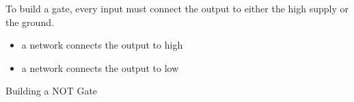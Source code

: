 \documentclass[mathserif, handout]{beamer}
\begin{document}
\begin{frame}
  To build a gate, every input must connect the output to either the high supply or the ground.\\[3mm]
  \begin{itemize}
    \item a  network connects the output to high \\[1mm]
    \item a  network connects the output to low
  \end{itemize}
  \vspace{3mm}
  \begin{center}
  \end{center}
\end{frame}

\begin{frame}{Building a NOT Gate}
  \begin{center}
    \Large {}
  \end{center}
\end{frame}
\end{document}
